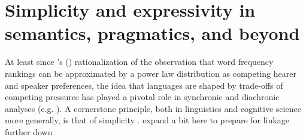 \documentclass[a4paper]{article}
\newcommand{\citeposs}[2][]{\citeauthor{#2}'s (\citeyear[#1]{#2})}
\newcommand{\hl}[1]{\textcolor[rgb]{.8,.33,.0}{#1}}%
\begin{document}


\section{Simplicity and expressivity in semantics, pragmatics, and beyond}
At least since \citeposs{zipf:1949} rationalization of the observation that word frequency rankings can be approximated by a power law distribution as competing hearer and speaker preferences, the idea that languages are shaped by trade-offs of competing pressures has played a pivotal role in synchronic and diachronic analyses (e.g. \citealt{martinet:1962, horn:1984,jaeger+vRooij:2007,jaeger:2007, piantadosi:2014,kirby+etal:2015}). A cornerstone principle, both in linguistics and cognitive science more generally, is that of simplicity \citep{chater+vitanyi:2003}. \hl{expand a bit here to prepare for linkage further down}

\end{document}
